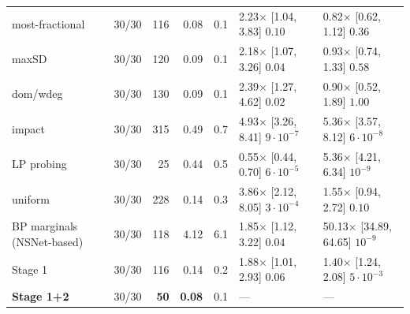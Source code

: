 \begin{table}[t]
{\begin{tabular}{lrrrrll}
most-fractional & 30/30 & 116 & 0.08 & 0.1 & 2.23$\times$ [1.04, 3.83] $0.10$ & 0.82$\times$ [0.62, 1.12] $0.36$ \\
maxSD & 30/30 & 120 & 0.09 & 0.1 & 2.18$\times$ [1.07, 3.26] $0.04$ & 0.93$\times$ [0.74, 1.33] $0.58$ \\
dom/wdeg & 30/30 & 130 & 0.09 & 0.1 & 2.39$\times$ [1.27, 4.62] $0.02$ & 0.90$\times$ [0.52, 1.89] $1.00$ \\
impact & 30/30 & 315 & 0.49 & 0.7 & 4.93$\times$ [3.26, 8.41] $9\cdot10^{-7}$ & 5.36$\times$ [3.57, 8.12] $6\cdot10^{-8}$ \\
LP probing & 30/30 & 25 & 0.44 & 0.5 & 0.55$\times$ [0.44, 0.70] $6\cdot10^{-5}$ & 5.36$\times$ [4.21, 6.34] $10^{-9}$ \\
uniform & 30/30 & 228 & 0.14 & 0.3 & 3.86$\times$ [2.12, 8.05] $3\cdot10^{-4}$ & 1.55$\times$ [0.94, 2.72] $0.10$ \\
BP marginals (NSNet-based) & 30/30 & 118 & 4.12 & 6.1 & 1.85$\times$ [1.12, 3.22] $0.04$ & 50.13$\times$ [34.89, 64.65] $10^{-9}$ \\
Stage 1 & 30/30 & 116 & 0.14 & 0.2 & 1.88$\times$ [1.01, 2.93] $0.06$ & 1.40$\times$ [1.24, 2.08] $5\cdot10^{-3}$ \\
\textbf{Stage 1+2} & 30/30 & \textbf{50} & \textbf{0.08} & 0.1 & --- & --- \\
\bottomrule
\end{tabular}}
\end{table}